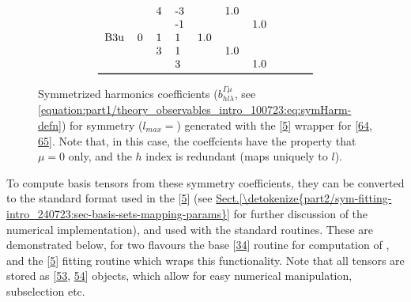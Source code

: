 \documentclass[letterpaper,table,10pt,english]{jupyterBook}
\begin{document}
\begin{figure}[htbp]
\begin{equation*}
\begin{split}
\begin{tabular}{llllllllll}
    &   & 4 & -3 &      &  1.0 &      &      &      &      \\
    &   &   & -1 &      &      &  1.0 &      &      &      \\
B3u & 0 & 1 &  1 &  1.0 &      &      &      &      &      \\
    &   & 3 &  1 &      &  1.0 &      &      &      &      \\
    &   &   &  3 &      &      &  1.0 &      &      &      \\
\bottomrule
\end{tabular}\end{split}
\end{equation*}\caption{Symmetrized harmonics coefficients (\(b_{hl\lambda}^{\Gamma\mu}\), see \eqref{equation:part1/theory_observables_intro_100723:eq:symHarm-defn}) for  symmetry (\(l_{max}=\)) generated with the  {[}\hyperlink{cite.backmatter/bibliography:id680}{5}{]} wrapper for  {[}\hyperlink{cite.backmatter/bibliography:id706}{64}, \hyperlink{cite.backmatter/bibliography:id707}{65}{]}. Note that, in this case, the coeffcients have the property that \(\mu=0\) only, and the \(h\) index is redundant (maps uniquely to \(l\)).}\label{\detokenize{part1/theory_tensor_formalism_160723:tab-d2hxlm}}\end{figure}

\sphinxAtStartPar
To compute basis tensors from these symmetry coefficients, they can be converted to the standard {\hyperref[\detokenize{backmatter/glossary:term-radial-matrix-elements}]{}} format used in the  {[}\hyperlink{cite.backmatter/bibliography:id680}{5}{]} (see \hyperref[\detokenize{part2/sym-fitting-intro_240723:sec-basis-sets-mapping-params}]{Sect.\@ \ref{\detokenize{part2/sym-fitting-intro_240723:sec-basis-sets-mapping-params}}} for further discussion of the numerical implementation), and used with the standard routines. These are demonstrated below, for two flavours \sphinxhyphen{} the base  {[}\hyperlink{cite.backmatter/bibliography:id606}{34}{]} routine for computation of {\hyperref[\detokenize{backmatter/glossary:term-AF}]{}}, and the  {[}\hyperlink{cite.backmatter/bibliography:id680}{5}{]} fitting routine which wraps this functionality. Note that all tensors are stored as  {[}\hyperlink{cite.backmatter/bibliography:id696}{53}, \hyperlink{cite.backmatter/bibliography:id971}{54}{]} objects, which allow for easy numerical manipulation, subselection etc.
\end{document}
